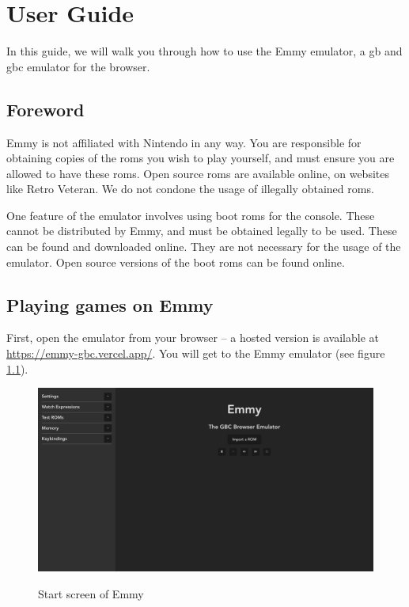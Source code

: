 \chapter{User Guide}

In this guide, we will walk you through how to use the Emmy emulator, a \glsdesc{gb} and \glsdesc{gbc} emulator for the browser.

\section{Foreword}

Emmy is not affiliated with Nintendo in any way. You are responsible for obtaining copies of the \glspl{rom} you wish to play yourself, and must ensure you are allowed to have these \glspl{rom}. Open source \glspl{rom} are available online, on websites like Retro Veteran. We do not condone the usage of illegally obtained \glspl{rom}.

One feature of the emulator involves using boot \glspl{rom} for the console. These cannot be distributed by Emmy, and must be obtained legally to be used. These can be found and downloaded online. They are not necessary for the usage of the emulator. Open source versions of the boot \glspl{rom} can be found online.


\section{Playing games on Emmy}

First, open the emulator from your browser -- a hosted version is available at \url{https://emmy-gbc.vercel.app/}. You will get to the Emmy emulator (see figure \ref{fig:emmy-startup-screen}).

\begin{figure}[h]
    \centering
    \includegraphics[width=12cm]{images/emmy-startup-screen}\\
    \caption{Start screen of Emmy}
    \label{fig:emmy-startup-screen}
\end{figure}

